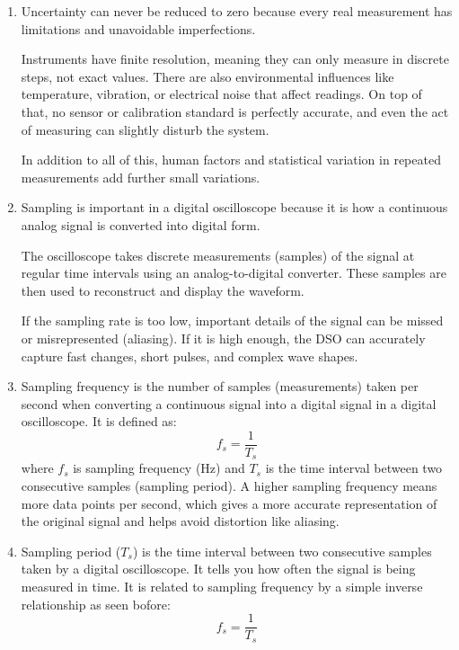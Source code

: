 \documentclass[../main.tex]{subfiles}
\begin{document}
\begin{enumerate}[label=\textbf{\arabic*.}]
	\item Uncertainty can never be reduced to zero because every real measurement has limitations and unavoidable imperfections.

	Instruments have finite resolution, meaning they can only measure in discrete steps, not exact values. There are also environmental influences like temperature, vibration, or electrical noise that affect readings. On top of that, no sensor or calibration standard is perfectly accurate, and even the act of measuring can slightly disturb the system.

	In addition to all of this, human factors and statistical variation in repeated measurements add further small variations.

	\item Sampling is important in a digital oscilloscope because it is how a continuous analog signal is converted into digital form.
	
	The oscilloscope takes discrete measurements (samples) of the signal at regular time intervals using an analog-to-digital converter. These samples are then used to reconstruct and display the waveform.

	If the sampling rate is too low, important details of the signal can be missed or misrepresented (aliasing). If it is high enough, the DSO can accurately capture fast changes, short pulses, and complex wave shapes.

	\item Sampling frequency is the number of samples (measurements) taken per second when converting a continuous signal into a digital signal in a digital oscilloscope. It is defined as:
	\begin{equation}
		f_s = \frac{1}{T_s}
	\end{equation}	
	where $f_s$ is sampling frequency (Hz) and $T_s$ is the time interval between two consecutive samples (sampling period). A higher sampling frequency means more data points per second, which gives a more accurate representation of the original signal and helps avoid distortion like aliasing.
	
	\item Sampling period ($T_s$) is the time interval between two consecutive samples taken by a digital oscilloscope. It tells you how often the signal is being measured in time. It is related to sampling frequency by a simple inverse relationship as seen bofore:
	\begin{equation}
		f_s = \frac{1}{T_s}
	\end{equation}
	

\end{enumerate}
\end{document}

